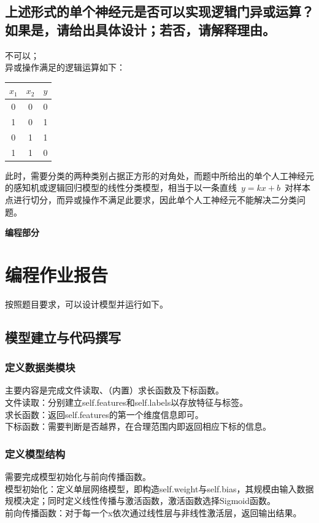 \documentclass[UTF8, a4paper]{article}
\begin{document}
\subsection{上述形式的单个神经元是否可以实现逻辑门异或运算？如果是，请给出具体设计；若否，请解释理由。}
不可以；\\
异或操作满足的逻辑运算如下：
\begin{center}
    \begin{tabular}{| c | c | c |}
        \hline
        $ x_1 $ & $ x_2 $ & $ y $ \\
        \hline
        0 & 0 & 0 \\
        1 & 0 & 1 \\
        0 & 1 & 1 \\
        1 & 1 & 0 \\
        \hline
    \end{tabular}
\end{center}
此时，需要分类的两种类别占据正方形的对角处，而题中所给出的单个人工神经元的感知机或逻辑回归模型的线性分类模型，相当于以一条直线\ $ y=kx+b $\ 对样本点进行切分，而异或操作不满足此要求，因此单个人工神经元不能解决二分类问题。\\

\vspace{6mm}
\centerline{\textbf{\Large{编程部分}}}
\vspace{3mm}
\section{编程作业报告}
按照题目要求，可以设计模型并运行如下。
\subsection{模型建立与代码撰写}
\subsubsection{定义数据类模块}
主要内容是完成文件读取、（内置）求长函数及下标函数。\\
文件读取：分别建立self.features和self.labels以存放特征与标签。\\
求长函数：返回self.features的第一个维度信息即可。\\
下标函数：需要判断是否越界，在合理范围内即返回相应下标的信息。
\subsubsection{定义模型结构}
需要完成模型初始化与前向传播函数。\\
模型初始化：定义单层网络模型，即构造self.weight与self.bias，其规模由输入数据规模决定；同时定义线性传播与激活函数，激活函数选择Sigmoid函数。\\
前向传播函数：对于每一个x依次通过线性层与非线性激活层，返回输出结果。
\end{document}
